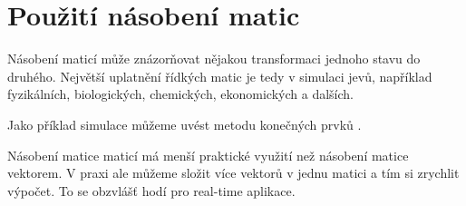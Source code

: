 
\section{Použití násobení matic}

Násobení maticí může znázorňovat nějakou transformaci jednoho stavu do druhého. Největší uplatnění řídkých matic je tedy v simulaci jevů, například fyzikálních, biologických, chemických, ekonomických a dalších. 

Jako příklad simulace můžeme uvést metodu konečných prvků \cite{4020926}\cite{0967-3334-30-6-S01}.


Násobení matice maticí má menší praktické využití než násobení matice vektorem. V praxi ale můžeme složit více vektorů v jednu matici a tím si zrychlit výpočet. To se obzvlášť hodí pro real-time aplikace.



